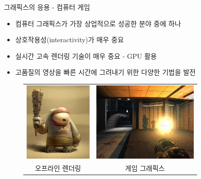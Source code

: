 \documentclass{beamer}
\begin{document}
\begin{frame}{그래픽스의 응용 - 컴퓨터 게임}

\begin{itemize}
\item 컴퓨터 그래픽스가 가장 상업적으로 성공한 분야 중에 하나
\item 상호작용성(interactivity)가 매우 중요
\item 실시간 고속 렌더링 기술이 매우 중요 - GPU 활용
\item 고품질의 영상을 빠른 시간에 그려내기 위한 다양한 기법을 발전
\end{itemize}

\begin{figure}
\begin{tabular}{cc}
    \includegraphics[height=4cm]{OGL_intro/animation.jpg}&
    \includegraphics[height=4cm]{OGL_intro/game.jpg}\\
오프라인 렌더링 & 게임 그래픽스
\end{tabular}
\end{figure}

\end{frame}
\end{document}
